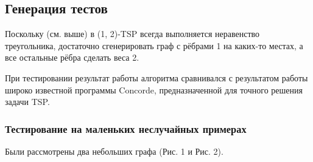 \subsection{Генерация тестов}
Поскольку (см. выше) в (1, 2)-TSP всегда выполняется неравенство треугольника, достаточно сгенерировать граф с рёбрами 1 на каких-то местах, а все остальные рёбра сделать веса 2.

При тестировании результат работы алгоритма сравнивался с результатом работы широко известной программы Concorde, предназначенной для точного решения задачи TSP.

\subsubsection{Тестирование на маленьких неслучайных примерах}
Были рассмотрены два небольших графа (Рис. 1 и Рис. 2).
\begin{figure}[H]
\centering
{}
\qquad
{}
\qquad
{}
\caption{}
\end{figure}

